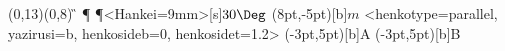 {\small
\begin{zahyou*}[ul=4mm](0,13)(0,8)
    \Landl\F\G{}\D
    \Candk{}\P\Q
    \Nuritubusi*{\E\F\G\H\E}
    \Drawlines{\F\G;\A\D}
    \Hasen{\D\P}
    \A\D\P<Hankei=9mm>[s]{$30\Deg$}
    \Put\A(8pt,-5pt)[b]{$m$}
    \HenKo<henkotype=parallel,
    yazirusi=b,
    henkosideb=0,
    henkosidet=1.2>\B{}
    \En*[0]
    \En{}
    \Put\A(-3pt,5pt)[b]{A}
    \En*[0]
    \En{}
    \Put\B(-3pt,5pt)[b]{B}


\end{zahyou*}}
